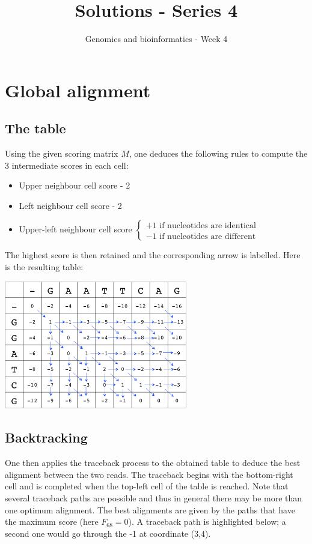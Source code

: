 \documentclass[english, a4paper,11pt]{article}
\title{Solutions - Series 4}
\date{}
\author{Genomics and bioinformatics - Week 4}
\begin{document}
\maketitle

\section{Global alignment}
\subsection{The table}
\noindent
Using the given scoring matrix $M$, one deduces the following rules to compute the 3 intermediate scores in each cell:
\begin{itemize}
\item Upper neighbour cell score - 2
\item Left neighbour cell score - 2
\item Upper-left neighbour cell score $\left\{\begin{array}{l} +1 \mbox{ if nucleotides are identical} \\ -1 \mbox{ if nucleotides are different}\end{array} \right.$
\end{itemize}
The highest score is then retained and the corresponding arrow is labelled. Here is the resulting table: \\
\begin{center}
\includegraphics[width=0.6\textwidth]{scoring.png}\\
\end{center}

\subsection{Backtracking}
\noindent
One then applies the traceback process to the obtained table to deduce the best alignment between the two reads. 
The traceback begins with the bottom-right cell and is completed when the top-left cell of the table is reached. Note that several 
traceback paths are possible and thus in general there may be more than one optimum alignment. The best alignments are given by the paths that have the maximum score (here $F_{68}=0$). A traceback path is highlighted below; a second one would go through the -1 at coordinate (3,4).
\end{document}
